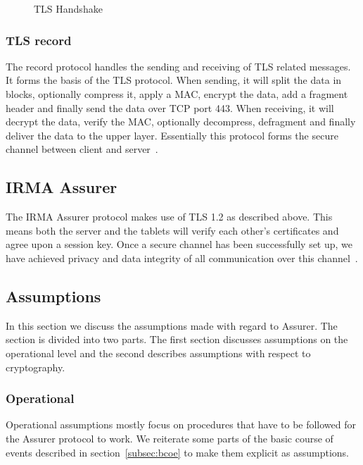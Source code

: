 \begin{figure}[htb]
\centering
\theverbbox
\caption{TLS Handshake}
\label{fig:tlshandshake}
\end{figure}

\subsubsection{TLS record}
The record protocol handles the sending and receiving of TLS related messages. It forms the basis of the TLS protocol. When sending, it will split the data in blocks, optionally compress it, apply a MAC, encrypt the data, add a fragment header and finally send the data over TCP port 443. When receiving, it will decrypt the data, verify the MAC, optionally decompress, defragment and finally deliver the data to the upper layer. Essentially this protocol forms the secure channel between client and server~\cite{tls1.2}.

\subsection{IRMA Assurer}
The IRMA Assurer protocol makes use of TLS 1.2 as described above. This means both the server and the tablets will verify each other's certificates and agree upon a session key. Once a secure channel has been successfully set up, we have achieved privacy and data integrity of all communication over this channel~\cite{tls1.2}.

\subsection{Assumptions}
\label{sec:assumptions}
In this section we discuss the assumptions made with regard to Assurer. The section is divided into two parts. The first section discusses assumptions on the operational level and the second describes assumptions with respect to cryptography.

\subsubsection{Operational}
Operational assumptions mostly focus on procedures that have to be followed for the Assurer protocol to work. We reiterate some parts of the basic course of events described in section~\ref{subsec:bcoe} to make them explicit as assumptions. 

